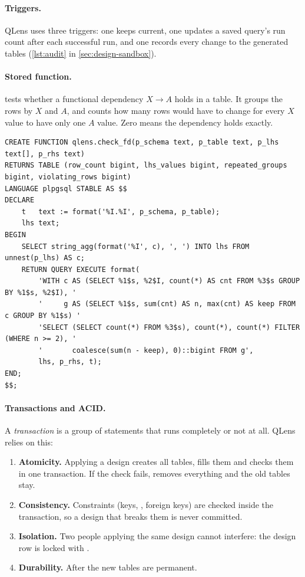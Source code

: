 \paragraph{Triggers.} QLens uses three triggers: one keeps  current, one updates a
saved query's run count after each successful run, and one records every change to the generated tables
(\cref{lst:audit} in \cref{sec:design-sandbox}).

\paragraph{Stored function.}  tests whether a functional dependency $X \rightarrow A$
holds in a table. It groups the rows by $X$ and $A$, and counts how many rows would have to change for
every $X$ value to have only one $A$ value. Zero means the dependency holds exactly.

\begin{lstlisting}[float=tbp,caption={[Stored function check\_fd]Stored function that measures a functional dependency},label={lst:checkfd}]
CREATE FUNCTION qlens.check_fd(p_schema text, p_table text, p_lhs text[], p_rhs text)
RETURNS TABLE (row_count bigint, lhs_values bigint, repeated_groups bigint, violating_rows bigint)
LANGUAGE plpgsql STABLE AS $$
DECLARE
    t   text := format('%I.%I', p_schema, p_table);
    lhs text;
BEGIN
    SELECT string_agg(format('%I', c), ', ') INTO lhs FROM unnest(p_lhs) AS c;
    RETURN QUERY EXECUTE format(
        'WITH c AS (SELECT %1$s, %2$I, count(*) AS cnt FROM %3$s GROUP BY %1$s, %2$I), '
        '     g AS (SELECT %1$s, sum(cnt) AS n, max(cnt) AS keep FROM c GROUP BY %1$s) '
        'SELECT (SELECT count(*) FROM %3$s), count(*), count(*) FILTER (WHERE n >= 2), '
        '       coalesce(sum(n - keep), 0)::bigint FROM g',
        lhs, p_rhs, t);
END;
$$;
\end{lstlisting}

\paragraph{Transactions and ACID.} A \emph{transaction} is a group of statements that runs completely or
not at all. QLens relies on this:
\begin{enumerate}
  \item \textbf{Atomicity.} Applying a design creates all tables, fills them and checks them in one
  transaction. If the check fails,  removes everything and the old tables stay.
  \item \textbf{Consistency.} Constraints (keys, , foreign keys) are checked inside the
  transaction, so a design that breaks them is never committed.
  \item \textbf{Isolation.} Two people applying the same design cannot interfere: the design row is
  locked with .
  \item \textbf{Durability.} After  the new tables are permanent.
\end{enumerate}

